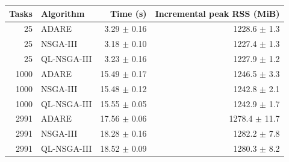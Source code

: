 \begin{tabular}{rlrr}
\toprule
Tasks & Algorithm & Time (s) & Incremental peak RSS (MiB) \\
\midrule
25 & ADARE & 3.29 $\pm$ 0.16 & 1228.6 $\pm$ 1.3 \\
25 & NSGA-III & 3.18 $\pm$ 0.10 & 1227.4 $\pm$ 1.3 \\
25 & QL-NSGA-III & 3.23 $\pm$ 0.16 & 1227.9 $\pm$ 1.2 \\
1000 & ADARE & 15.49 $\pm$ 0.17 & 1246.5 $\pm$ 3.3 \\
1000 & NSGA-III & 15.48 $\pm$ 0.12 & 1242.8 $\pm$ 2.1 \\
1000 & QL-NSGA-III & 15.55 $\pm$ 0.05 & 1242.9 $\pm$ 1.7 \\
2991 & ADARE & 17.56 $\pm$ 0.06 & 1278.4 $\pm$ 11.7 \\
2991 & NSGA-III & 18.28 $\pm$ 0.16 & 1282.2 $\pm$ 7.8 \\
2991 & QL-NSGA-III & 18.52 $\pm$ 0.09 & 1280.3 $\pm$ 8.2 \\
\bottomrule
\end{tabular}
